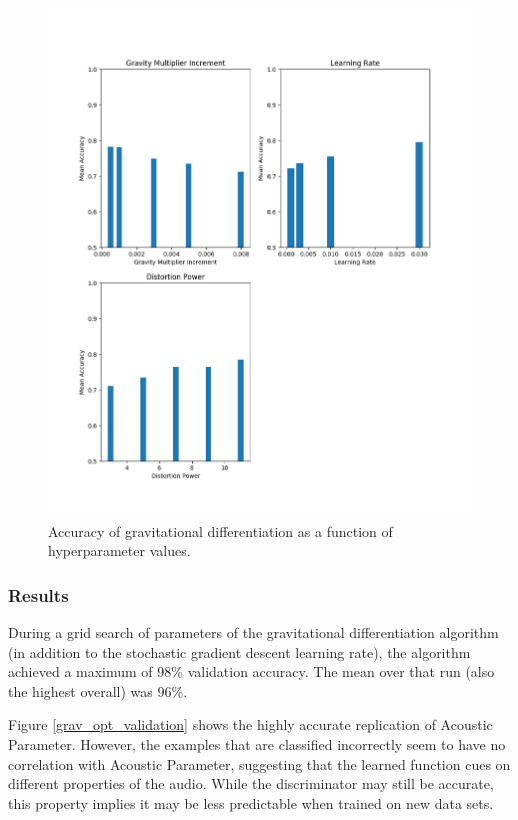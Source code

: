 \documentclass[10pt]{article}
\begin{document}
\begin{figure}[H]
    \centering
    \includegraphics[width=\textwidth]{grav_acc_by_hyper}
    \caption{\label{grav_acc_by_hyper} Accuracy of gravitational differentiation as a function of hyperparameter values.}
\end{figure}

\subsubsection{Results}

During a grid search of parameters of the gravitational differentiation algorithm (in addition to the stochastic gradient descent learning rate), the algorithm achieved a maximum of 98\% validation accuracy. The mean over that run (also the highest overall) was 96\%.

Figure \ref{grav_opt_validation} shows the highly accurate replication of Acoustic Parameter. However, the examples that are classified incorrectly seem to have no correlation with Acoustic Parameter, suggesting that the learned function cues on different properties of the audio. While the discriminator may still be accurate, this property implies it may be less predictable when trained on new data sets.
\end{document}
